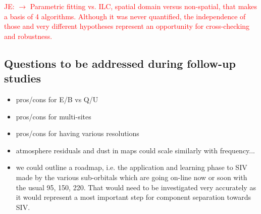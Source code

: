 \textcolor{red}{JE: $\rightarrow$ Parametric fitting vs. ILC, spatial domain versus non-spatial, that makes a basis of 4 algorithms. Although it was never quantified, the independence of those and very different hypotheses represent an opportunity for cross-checking and robustness.}

\subsection{Questions to be addressed during follow-up studies}
\begin{itemize}
	\item pros/cons for E/B vs Q/U
	\item pros/cons for multi-sites
	\item pros/cons for having various resolutions
	\item atmosphere residuals and dust in maps could scale similarly with frequency...
	\item we could outline a roadmap, i.e. the application and learning phase to SIV made by the various sub-orbitals which are going on-line now or soon with the usual 95, 150, 220. That would need to be investigated very accurately as it would represent a most important step for component separation
towards SIV.
\end{itemize}





%



